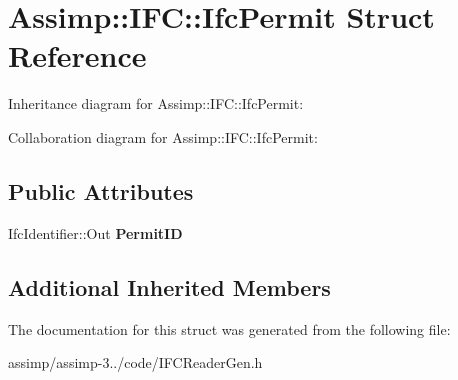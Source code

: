 \hypertarget{struct_assimp_1_1_i_f_c_1_1_ifc_permit}{\section{Assimp\+:\+:I\+F\+C\+:\+:Ifc\+Permit Struct Reference}
\label{struct_assimp_1_1_i_f_c_1_1_ifc_permit}
}


Inheritance diagram for Assimp\+:\+:I\+F\+C\+:\+:Ifc\+Permit\+:


Collaboration diagram for Assimp\+:\+:I\+F\+C\+:\+:Ifc\+Permit\+:
\subsection*{Public Attributes}
\begin{DoxyCompactItemize}
\item 
\hypertarget{struct_assimp_1_1_i_f_c_1_1_ifc_permit_a92c2b2623aca7601c23e743127c41569}{Ifc\+Identifier\+::\+Out {\bfseries Permit\+I\+D}}\label{struct_assimp_1_1_i_f_c_1_1_ifc_permit_a92c2b2623aca7601c23e743127c41569}

\end{DoxyCompactItemize}
\subsection*{Additional Inherited Members}


The documentation for this struct was generated from the following file\+:\begin{DoxyCompactItemize}
\item 
assimp/assimp-\/3../code/I\+F\+C\+Reader\+Gen.\+h\end{DoxyCompactItemize}

